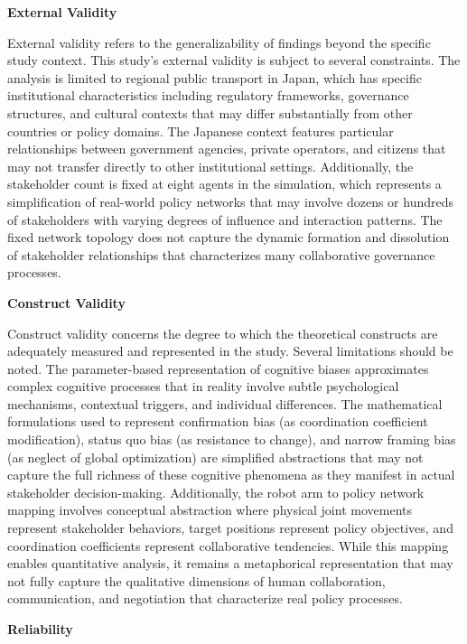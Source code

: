 \textbf{External Validity}

External validity refers to the generalizability of findings beyond the
specific study context. This study's external validity is subject to
several constraints. The analysis is limited to regional public
transport in Japan, which has specific institutional characteristics
including regulatory frameworks, governance structures, and cultural
contexts that may differ substantially from other countries or policy
domains. The Japanese context features particular relationships between
government agencies, private operators, and citizens that may not
transfer directly to other institutional settings. Additionally, the
stakeholder count is fixed at eight agents in the simulation, which
represents a simplification of real-world policy networks that may
involve dozens or hundreds of stakeholders with varying degrees of
influence and interaction patterns. The fixed network topology does not
capture the dynamic formation and dissolution of stakeholder
relationships that characterizes many collaborative governance
processes.

\textbf{Construct Validity}

Construct validity concerns the degree to which the theoretical
constructs are adequately measured and represented in the study. Several
limitations should be noted. The parameter-based representation of
cognitive biases approximates complex cognitive processes that in
reality involve subtle psychological mechanisms, contextual triggers,
and individual differences. The mathematical formulations used to
represent confirmation bias (as coordination coefficient modification),
status quo bias (as resistance to change), and narrow framing bias (as
neglect of global optimization) are simplified abstractions that may not
capture the full richness of these cognitive phenomena as they manifest
in actual stakeholder decision-making. Additionally, the robot arm to
policy network mapping involves conceptual abstraction where physical
joint movements represent stakeholder behaviors, target positions
represent policy objectives, and coordination coefficients represent
collaborative tendencies. While this mapping enables quantitative
analysis, it remains a metaphorical representation that may not fully
capture the qualitative dimensions of human collaboration,
communication, and negotiation that characterize real policy processes.

\textbf{Reliability}

